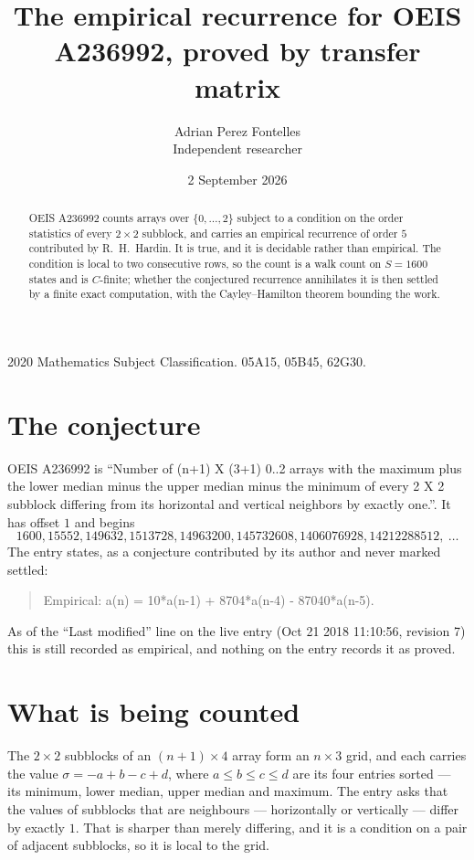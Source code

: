 \documentclass[11pt,a4paper]{article}
\title{The empirical recurrence for OEIS A236992, proved by transfer matrix}
\author{Adrian Perez Fontelles\\ \small Independent researcher}
\date{2 September 2026}
\theoremstyle{plain}
\theoremstyle{definition}
\begin{document}
\maketitle

\begin{abstract}
OEIS A236992 counts arrays over $\{0,\dots,2\}$ subject to a condition on the order
statistics of every $2\times2$ subblock, and carries an empirical recurrence of order
$5$ contributed by R.~H.~Hardin. It is true, and it is decidable rather than empirical.
The condition is local to two consecutive rows, so the count is a walk count on $S=1600$
states and is $C$-finite; whether the conjectured recurrence annihilates it is then settled by
a finite exact computation, with the Cayley--Hamilton theorem bounding the work.
\end{abstract}

\noindent\small 2020 Mathematics Subject Classification. 05A15, 05B45, 62G30.\normalsize

\section{The conjecture}

OEIS A236992 is ``Number of (n+1) X (3+1) 0..2 arrays with the maximum plus the lower median minus the upper median minus the minimum of every 2 X 2 subblock differing from its horizontal and vertical neighbors by exactly one.''. It has offset $1$ and begins
\[
1600, 15552, 149632, 1513728, 14963200, 145732608, 1406076928, 14212288512,\ \dots
\]
The entry states, as a conjecture contributed by its author and never marked settled:
\begin{quote}
Empirical: a(n) = 10*a(n-1) + 8704*a(n-4) - 87040*a(n-5).
\end{quote}
As of the ``Last modified'' line on the live entry (Oct 21 2018 11:10:56, revision 7) this is still
recorded as empirical, and nothing on the entry records it as proved.

\section{What is being counted}

The $2\times2$ subblocks of an $(n+1)\times4$ array form an
$n\times3$ grid, and each carries the value $\sigma=-a+b-c+d$, where $a\le b\le c\le d$ are its four entries sorted --- its minimum, lower median, upper median and maximum. The entry asks that the values of
subblocks that are neighbours --- horizontally or vertically --- differ by exactly $1$.
That is sharper than merely differing, and it is a condition on a pair of adjacent subblocks,
so it is local to the grid.
\end{document}
